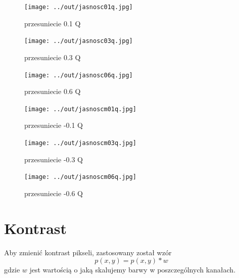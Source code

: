\documentclass[a4paper,12pt]{article}
\begin{document}
\begin{figure}[h!]
\begin{minipage}[t]{5cm}
\begin{center}
\texttt{[image: ../out/jasnosc01q.jpg]}
\caption{przesuniecie 0.1 Q}
\end{center}
\end{minipage}
\hfill
\begin{minipage}[t]{5cm}
\begin{center}
\texttt{[image: ../out/jasnosc03q.jpg]}
\caption{przesuniecie 0.3 Q}
\end{center}
\end{minipage}
\hfill
\begin{minipage}[t]{5cm}
\begin{center}
\texttt{[image: ../out/jasnosc06q.jpg]}
\caption{przesuniecie 0.6 Q}
\end{center}
\end{minipage}
\end{figure}

\begin{figure}[h!]
\begin{minipage}[t]{5cm}
\begin{center}
\texttt{[image: ../out/jasnoscm01q.jpg]}
\caption{przesuniecie -0.1 Q}
\end{center}
\end{minipage}
\hfill
\begin{minipage}[t]{5cm}
\begin{center}
\texttt{[image: ../out/jasnoscm03q.jpg]}
\caption{przesuniecie -0.3 Q}
\end{center}
\end{minipage}
\hfill
\begin{minipage}[t]{5cm}
\begin{center}
\texttt{[image: ../out/jasnoscm06q.jpg]}
\caption{przesuniecie -0.6 Q}
\end{center}
\end{minipage}
\end{figure}



\newpage
\section{Kontrast}
Aby zmienić kontrast pikseli, zastosowany został wzór
$$p(x, y) = p(x, y) * w$$
gdzie $w$ jest wartością o jaką skalujemy barwy w poszczególnych kanałach.


\end{document}
